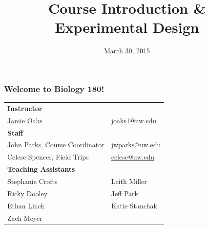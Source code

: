


% 



\title[Intro \& Experimental Design]{Course Introduction \& Experimental Design}
\date{March 30, 2015}



\begin{noheadline}
\maketitle
\end{noheadline}


\begin{noheadline}
\begin{frame}
\frametitle{Welcome to Biology 180!}

    \begin{table}%
        \centering
        \begin{tabular}{ l l }
            \textbf{Instructor} & \\
            Jamie Oaks & \href{mailto:joaks1@uw.edu}{joaks1@uw.edu} \\[1.5ex]
            \textbf{Staff} & \\
            John Parks, Course Coordinator & \href{mailto:jwparks@uw.edu}{jwparks@uw.edu} \\
            Celese Spencer, Field Trips & \href{mailto:celese@uw.edu}{celese@uw.edu} \\[1.5ex]
            \textbf{Teaching Assistants} & \\
            Stephanie Crofts    & Leith Miller \\
            Ricky Dooley        & Jeff Park \\
            Ethan Linck         & Katie Stanchak\\
            Zach Meyer          & \\
        \end{tabular}
    \end{table}

\end{frame}
\end{noheadline}

